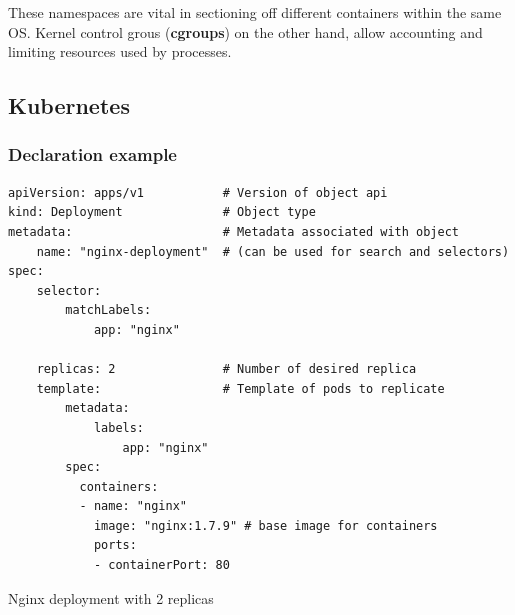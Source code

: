 \documentclass[11pt]{article}
\begin{document}
These namespaces are vital in sectioning off different containers within the same OS. Kernel control grous (\textbf{cgroups}) on the other hand, allow accounting and limiting resources used by processes.

\subsection{Kubernetes}

\subsubsection{Declaration example} \label{sec:declaration}

\begin{listing}[H]
  \begin{verbatim}
apiVersion: apps/v1           # Version of object api
kind: Deployment              # Object type
metadata:                     # Metadata associated with object
    name: "nginx-deployment"  # (can be used for search and selectors)
spec:
    selector:
        matchLabels:
            app: "nginx"

    replicas: 2               # Number of desired replica 
    template:                 # Template of pods to replicate
        metadata:
            labels:
                app: "nginx"
        spec:
          containers:
          - name: "nginx"
            image: "nginx:1.7.9" # base image for containers
            ports:
            - containerPort: 80
  \end{verbatim}
\caption{Nginx deployment with 2 replicas}
\label{appendix:deployment}
\end{listing}
\end{document}

